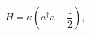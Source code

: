 \begin{equation}
\label{hamiltonian}
H = \kappa \left(a^{\dagger}a - \frac{1}{2}\right),
\end{equation}

